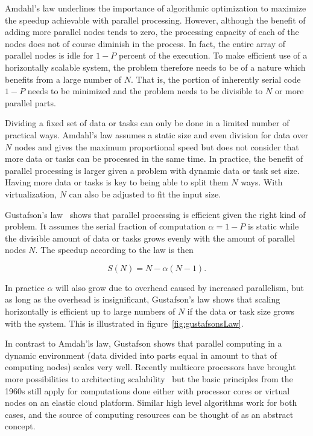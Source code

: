 \documentclass[english]{tktltiki2}
\theoremstyle{definition}
\theoremstyle{remark}
\begin{document}
Amdahl’s law underlines the importance of algorithmic optimization to maximize
the speedup achievable with parallel processing. However, although the benefit
of adding more parallel nodes tends to zero, the processing capacity of each of
the nodes does not of course diminish in the process. In fact, the entire array
of parallel nodes is idle for $1-P$ percent of the execution. To make efficient
use of a horizontally scalable system, the problem therefore needs to be of a
nature which benefits from a large number of $N$. That is, the portion of
inherently serial code $1-P$ needs to be minimized and the problem needs to be
divisible to $N$ or more parallel parts.

Dividing a fixed set of data or tasks can only be done in a limited number of
practical ways. Amdahl’s law assumes a static size and even division for data
over $N$ nodes and gives the maximum proportional speed but does not consider
that more data or tasks can be processed in the same time. In practice, the
benefit of parallel processing is larger given a problem with dynamic data or
task set size. Having more data or tasks is key to being able to split them $N$
ways. With virtualization, $N$ can also be adjusted to fit the input size.

Gustafson’s law~\cite{gustafsonslaw} shows that parallel processing is efficient
given the right kind of problem. It assumes the serial fraction of computation
$\alpha=1-P$ is static while the divisible amount of data or tasks grows evenly
with the amount of parallel nodes $N$. The speedup according to the law is then

\begin{equation}
S(N) = N - \alpha(N-1).
\label{eq:gustafsonslaw}
\end{equation}

In practice $\alpha$ will also grow due to overhead caused by increased
parallelism, but as long as the overhead is insignificant, Gustafson’s law shows
that scaling horizontally is efficient up to large numbers of $N$ if the data or
task size grows with the system. This is illustrated in figure~\ref{fig:gustafsonsLaw}.

In contrast to Amdah’ls law, Gustafson shows that parallel computing in a
dynamic environment (data divided into parts equal in amount to that of
computing nodes) scales very well. Recently multicore processors have brought
more possibilities to architecting scalability~\cite{amhdalmulticore} but the
basic principles from the 1960s still apply for computations done either with
processor cores or virtual nodes on an elastic cloud platform. Similar high level
algorithms work for both cases, and the source of computing resources can be
thought of as an abstract concept.
\end{document}
